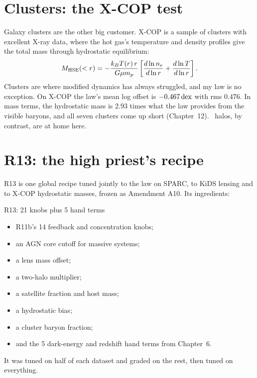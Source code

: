 

\section{Clusters: the X-COP test}

Galaxy clusters are the other big customer. X-COP is a sample of clusters with excellent X-ray data, where the hot gas's temperature and density profiles give the total mass through hydrostatic equilibrium:
\begin{equation}
M_{\rm HSE}(<r)=-\frac{k_BT(r)\,r}{G\mu m_p}\left[\frac{d\ln n_e}{d\ln r}+\frac{d\ln T}{d\ln r}\right].
\end{equation}
Clusters are where modified dynamics has always struggled, and my law is no exception. On X-COP the law's mean log offset is $-0.467\,\mathrm{dex}$ with rms $0.476$. In mass terms, the hydrostatic mass is 2.93 times what the law provides from the visible baryons, and all seven clusters come up short (Chapter~12). \LCDM\ halos, by contrast, are at home here.




\section{R13: the high priest's recipe}

R13 is one global recipe tuned jointly to the law on SPARC, to KiDS lensing and to X-COP hydrostatic masses, frozen as Amendment A10. Its ingredients:

\begin{knobbox}{R13: 21 knobs plus 5 hand terms}
\begin{itemize}
\item R11b's 14 feedback and concentration knobs;
\item an AGN core cutoff for massive systems;
\item a lens mass offset;
\item a two-halo multiplier;
\item a satellite fraction and host mass;
\item a hydrostatic bias;
\item a cluster baryon fraction;
\item and the 5 dark-energy and redshift hand terms from Chapter~6.
\end{itemize}
It was tuned on half of each dataset and graded on the rest, then tuned on everything.
\end{knobbox}

